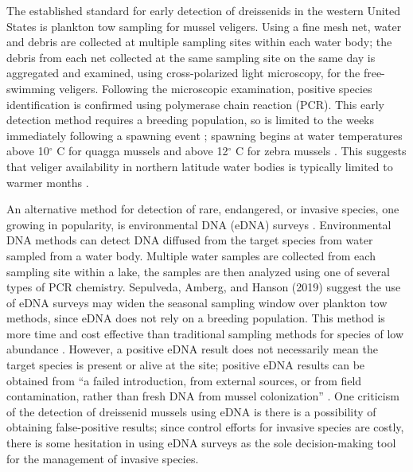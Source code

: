 \documentclass[12pt]{article}\usepackage[]{graphicx}\usepackage[]{color}
\begin{document}
The established standard for early detection of dreissenids in the western United States is plankton tow sampling for mussel veligers. Using a fine mesh net, water and debris are collected at multiple sampling sites within each water body; the debris from each net collected at the same sampling site on the same day is aggregated and examined, using cross-polarized light microscopy, for the free-swimming veligers. Following the microscopic examination, positive species identification is confirmed using polymerase chain reaction (PCR). This early detection method requires a breeding population, so is limited to the weeks immediately following a spawning event \cite{Nichols}; spawning begins at water temperatures above 10$^\circ$ C for quagga mussels and above 12$^\circ$ C for zebra mussels \cite{McMahon, Mills}. This suggests that veliger availability in northern latitude water bodies is typically limited to warmer months \cite{Sepulveda:eDNA}.

An alternative method for detection of rare, endangered, or invasive species, one growing in popularity, is environmental DNA (eDNA) surveys \cite{Schmelzle}. Environmental DNA methods can detect DNA diffused from the target species from water sampled from a water body. Multiple water samples are collected from each sampling site within a lake, the samples are then analyzed using one of several types of PCR chemistry. Sepulveda, Amberg, and Hanson (2019) suggest the use of eDNA surveys may widen the seasonal sampling window over plankton tow methods, since eDNA does not rely on a breeding population. This method is more time and cost effective than traditional sampling methods for species of low abundance \cite{Rees}. However, a positive eDNA result does not necessarily mean the target species is present or alive at the site; positive eDNA results can be obtained from ``a failed introduction, from external sources, or from field contamination, rather than fresh DNA from mussel colonization'' \cite{Sepulveda:eDNA}. One criticism of the detection of dreissenid mussels using eDNA is there is a possibility of obtaining false-positive results; since control efforts for invasive species are costly, there is some hesitation in using eDNA surveys as the sole decision-making tool for the management of invasive species. 
\end{document}
